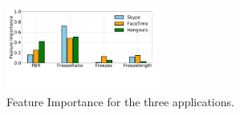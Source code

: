\begin{figure}[t]
      \centering
      \includegraphics[width=0.45\textwidth]{sections/network-work/feature-imp.pdf}
      \vspace{-4em}
      \caption{Feature Importance for the three applications.}
      \label{fig:ft-imp}
\end{figure}

